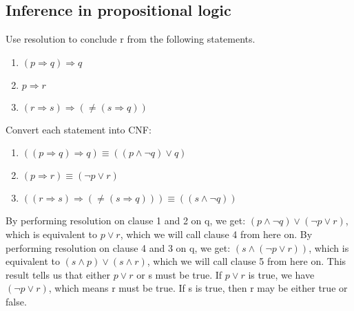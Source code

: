 \subsection{Inference in propositional logic}
\begin{large}
    Use resolution to conclude r from the following statements.
    \begin{enumerate}
        \item $ (p \Rightarrow q) \Rightarrow q $
        \item $ p \Rightarrow r $
        \item $ (r \Rightarrow s) \Rightarrow (\neq (s \Rightarrow q)) $
    \end{enumerate}
    Convert each statement into CNF\@:
    \begin{enumerate}
        \item $ ((p \Rightarrow q) \Rightarrow q) \equiv ((p \land \neg q) \lor q) $
        \item $ (p \Rightarrow r) \equiv (\neg p \lor r) $
        \item $ ((r \Rightarrow s) \Rightarrow (\neq (s \Rightarrow q))) \equiv ((s \land \neg q))$
    \end{enumerate}
    By performing resolution on clause 1 and 2 on q, we get:
    $ (p \land \neg q) \lor (\neg p \lor r)  $, which is equivalent to $ p \lor r $, which we will call clause 4 from here on.
    By performing resolution on clause 4 and 3 on q, we get:
    $ (s \land (\neg p \lor r)) $, which is equivalent to $ (s \land p) \lor (s \land r) $, which we will call clause 5 from here on.
    This result tells us that either $ p \lor r $ or s must be true.
    If $ p \lor r $ is true, we have $ (\neg p \lor r) $, which means r must be true.
    If s is true, then r may be either true or false.
\end{large}